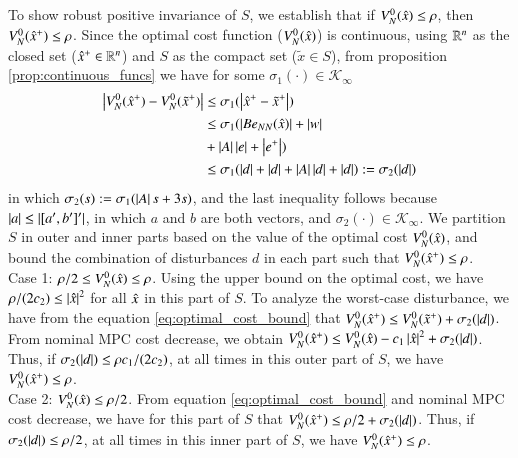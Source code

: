 \documentclass[preprint,5p, twocolumn, authoryear]{elsarticle}
\begin{document}
To show robust positive invariance of $S$,  
we establish that if $V_N^0(\hat{x}) \leq \rho$, then $V_N^0(\hat{x}^+) \leq \rho$.
Since the optimal cost function ($V_N^0(\hat{x})$) is continuous, using $\mathbb{R}^n$
as the closed set ($\hat{x}^+ \in \mathbb{R}^n$) and $S$ as the compact set ($\tilde{x}
\in S$), from proposition \ref{prop:continuous_funcs} we have for some
$\sigma_1(\cdot) \in \mathcal{K}_{\infty}$
\begin{align}
    \left| V_N^0(\hat{x}^+) - V_N^0(\tilde{x}^+) \right| &\leq 
    \sigma_1(\left| \hat{x}^+ - \tilde{x}^+ \right|)  \nonumber  \\
    &\leq 
   \sigma_1(\left| B e_{NN}(\hat{x}) \right| + \left| w \right| 
   \nonumber \\
   & + \left| A \right|\left| e \right| +  \left| e^+ \right|) \nonumber \\
     &\leq 
   \sigma_1(\left| d \right| + \left| d \right| + \left| A \right|\left| d \right| + \left| d \right|) 
   := \sigma_2(\left| d \right|)
   \label{eq:optimal_cost_bound}
\end{align}
in which $\sigma_2(s) := \sigma_1(\left| A \right| s +3s)$, and the last inequality
follows because $\left| a \right| \leq \left| [a', b']' \right|$, in which $a$ and $b$ are both
vectors, and $\sigma_2(\cdot) \in \mathcal{K}_{\infty}$. We partition $S$ in
outer and inner parts based on the value of the optimal cost $V_N^0(\hat{x})$, and
bound the combination of disturbances $d$ in each part such that $V_N^0(\hat{x}^+)
\leq \rho$. \\
Case 1: $\rho/2 \leq V_N^0(\hat{x}) \leq \rho $. Using the upper bound on the
optimal cost, we have $\rho/(2c_2) \leq \left| \hat{x} \right|^2$ for all $\hat{x}$ in this
part of $S$. To analyze the worst-case disturbance, we have from the equation
\eqref{eq:optimal_cost_bound} that $V_N^0(\hat{x}^+) \leq V_N^0(\tilde{x}^+) +
\sigma_2(\left| d \right|) $. From nominal MPC cost decrease, we obtain  
$V_N^0(\hat{x}^+) \leq V_N^0(\hat{x}) - c_1\left| \hat{x} \right|^2 + \sigma_2(\left| d \right|)$.
Thus, if $\sigma_2(\left| d \right|) \leq \rho c_1/(2c_2)$, at all times in this outer
part of $S$, we have $V_N^0(\hat{x}^+) \leq \rho$. \\
Case 2: $V_N^0(\hat{x}) \leq \rho/2 $. From equation \eqref{eq:optimal_cost_bound}
and nominal MPC cost decrease, we have for this part of $S$ that $V_N^0(\hat{x}^+)
\leq \rho/2 + \sigma_2(\left| d \right|)$. Thus, if $\sigma_2(\left| d \right|) \leq \rho/2$, at
all times in this inner part of $S$, we have $V_N^0(\hat{x}^+) \leq \rho$.
\end{document}
